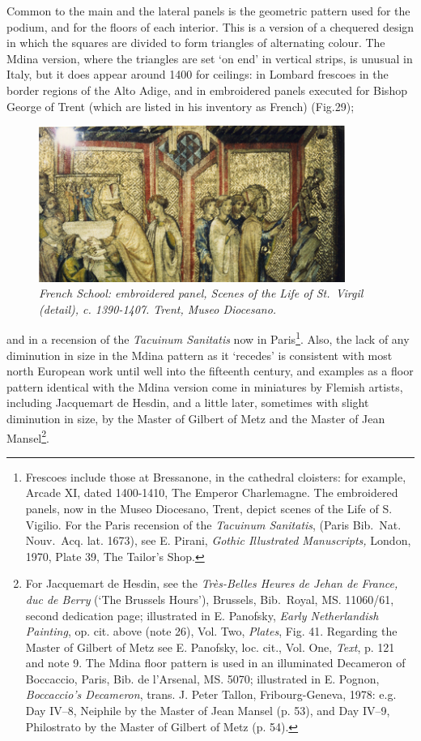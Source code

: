 \documentclass[a4paper,12pt]{article}
\begin{document}
Common to the main and the lateral panels is the geometric pattern
used for the podium, and for the floors of each interior.  This is a
version of a chequered design in which the squares are divided to form
triangles of alternating colour. The Mdina version, where the
triangles are set `on end' in vertical strips, is unusual in Italy,
but it does appear around 1400 for ceilings: in Lombard frescoes in
the border regions of the Alto Adige, and in embroidered panels
executed for Bishop George of Trent (which are listed in his inventory
as French) (Fig.29); 
\begin{figure}[htbp]
\centering
\includegraphics[width=10cm]{pics/fig29.png}
\caption[French School: embroidered panel, Scenes of the Life of St.~Virgil
(detail)] 
{\it French School: embroidered panel, Scenes of the Life of St.~Virgil
(detail), c. 1390-1407.  Trent, Museo Diocesano.}
\end{figure}
and in a recension of the \textit{Tacuinum
Sanitatis} now in Paris\footnote{Frescoes include those at Bressanone,
in the cathedral cloisters: for example, Arcade XI, dated 1400-1410,
The Emperor Charlemagne.  The embroidered panels, now in the Museo
Diocesano, Trent, depict scenes of the Life of S. Vigilio.  For the
Paris recension of the \textit{Tacuinum Sanitatis}, (Paris
Bib.~Nat. Nouv.~Acq. lat. 1673), see E. Pirani, \textit{Gothic
Illustrated Manuscripts, }London, 1970, Plate 39, The Tailor's
Shop.}. Also, the lack of any diminution in size in the Mdina pattern
as it `recedes' is consistent with most north European work until well
into the fifteenth century, and examples as a floor pattern identical
with the Mdina version come in miniatures by Flemish artists,
including Jacquemart de Hesdin, and a little later, sometimes with
slight diminution in size, by the Master of Gilbert of Metz and the
Master of Jean Mansel\footnote{For Jacquemart de Hesdin, see the
\textit{Tr\`es-Belles Heures de Jehan de France, duc de Berry} (`The
Brussels Hours'), Brussels, Bib.~Royal, MS. 11060/61, second dedication
page; illustrated in E. Panofsky, \textit{Early Netherlandish
Painting}, op. cit. above (note 26), Vol. Two, \textit{Plates},
Fig. 41. Regarding the Master of Gilbert of Metz see E. Panofsky,
loc. cit., Vol. One, \textit{Text}, p. 121 and note 9.  The Mdina
floor pattern is used in an illuminated Decameron of Boccaccio, Paris,
Bib. de l'Arsenal, MS. 5070; illustrated in E. Pognon,
\textit{Boccaccio's Decameron}, trans. J. Peter Tallon,
Fribourg-Geneva, 1978: e.g. Day IV--8, Neiphile by the Master of Jean
Mansel (p. 53), and Day IV--9, Philostrato by the Master of Gilbert
of Metz (p. 54).}.
\end{document}

